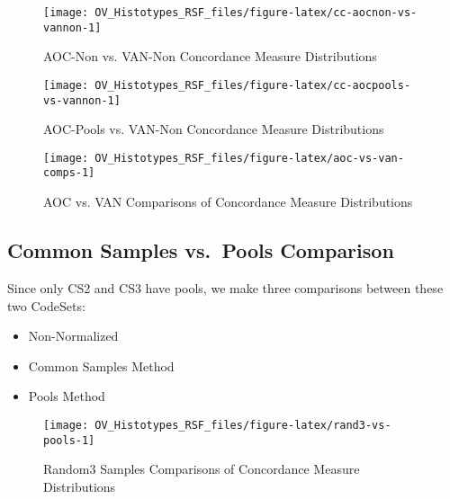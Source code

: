\documentclass[
]{report}
\providecommand{\tightlist}{%
  \setlength{\itemsep}{0pt}\setlength{\parskip}{0pt}}
\begin{document}
\begin{figure}[H]

{\centering \texttt{[image: OV\_Histotypes\_RSF\_files/figure-latex/cc-aocnon-vs-vannon-1]} 

}

\caption{AOC-Non vs. VAN-Non Concordance Measure Distributions}\label{fig:cc-aocnon-vs-vannon}
\end{figure}

\begin{figure}[H]

{\centering \texttt{[image: OV\_Histotypes\_RSF\_files/figure-latex/cc-aocpools-vs-vannon-1]} 

}

\caption{AOC-Pools vs. VAN-Non Concordance Measure Distributions}\label{fig:cc-aocpools-vs-vannon}
\end{figure}

\begin{figure}[H]

{\centering \texttt{[image: OV\_Histotypes\_RSF\_files/figure-latex/aoc-vs-van-comps-1]} 

}

\caption{AOC vs. VAN Comparisons of Concordance Measure Distributions}\label{fig:aoc-vs-van-comps}
\end{figure}

\hypertarget{common-samples-vs.-pools-comparison}{%
\subsection{Common Samples vs.~Pools Comparison}\label{common-samples-vs.-pools-comparison}}

Since only CS2 and CS3 have pools, we make three comparisons between these two CodeSets:

\begin{itemize}
\tightlist
\item
  Non-Normalized
\item
  Common Samples Method
\item
  Pools Method
\end{itemize}

\begin{figure}[H]

{\centering \texttt{[image: OV\_Histotypes\_RSF\_files/figure-latex/rand3-vs-pools-1]} 

}

\caption{Random3 Samples Comparisons of Concordance Measure Distributions}\label{fig:rand3-vs-pools}
\end{figure}
\end{document}
